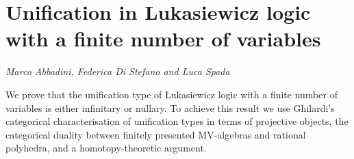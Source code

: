 \documentclass[../booklet.tex]{subfiles}
\begin{document}
\section[Unification in Lukasiewicz logic with a finite number of variables. {\it Marco Abbadini, Federica Di Stefano and Luca Spada}]{Unification in Lukasiewicz logic with a finite number of variables}
  

\begin{center}
  {\it Marco Abbadini, Federica Di Stefano and Luca Spada}
\end{center}

\vskip 0.8cm


We prove that the unification type of {\L}ukasiewicz logic with a finite number of variables is either infinitary or nullary.  To achieve this result we use Ghilardi's categorical characterisation of unification types in terms of projective objects,  the categorical duality between finitely presented MV-algebras and rational polyhedra, and a homotopy-theoretic argument.
\end{document}
